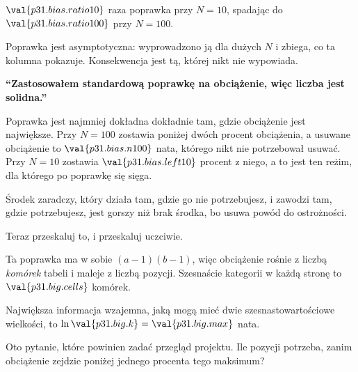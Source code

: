 \begin{fr}

$\val{p31.bias.ratio10}$ raza poprawka przy $N = 10$, spadając do
$\val{p31.bias.ratio100}$ przy $N = 100$.

Poprawka jest asymptotyczna: wyprowadzono ją dla dużych $N$ i zbiega, co ta
kolumna pokazuje. Konsekwencja jest tą, której nikt nie wypowiada.

\begin{trapbox}
\textbf{\enquote{Zastosowałem standardową poprawkę na obciążenie, więc
liczba jest solidna.}}

Poprawka jest najmniej dokładna dokładnie tam, gdzie obciążenie jest
największe. Przy $N = 100$ zostawia poniżej dwóch procent obciążenia, a
usuwane obciążenie to $\val{p31.bias.n100}$ nata, którego nikt nie
potrzebował usuwać. Przy $N = 10$ zostawia $\val{p31.bias.left10}$ procent
z niego, a to jest ten reżim, dla którego po poprawkę się sięga.

Środek zaradczy, który działa tam, gdzie go nie potrzebujesz, i zawodzi tam,
gdzie potrzebujesz, jest gorszy niż brak środka, bo usuwa powód do
ostrożności.
\end{trapbox}
\end{fr}

\begin{fr}
Teraz przeskaluj to, i przeskaluj uczciwie.

Ta poprawka ma w sobie $(a-1)(b-1)$, więc obciążenie rośnie z liczbą
\emph{komórek} tabeli i maleje z liczbą pozycji. Szesnaście kategorii w
każdą stronę to $\val{p31.big.cells}$ komórek.

Największa informacja wzajemna, jaką mogą mieć dwie szesnastowartościowe
wielkości, to $\ln \val{p31.big.k} = \val{p31.big.max}$ nata.

Oto pytanie, które powinien zadać przegląd projektu. Ile pozycji potrzeba,
zanim obciążenie zejdzie poniżej jednego procenta tego maksimum?
\dotline
\nextframe
\end{fr}

